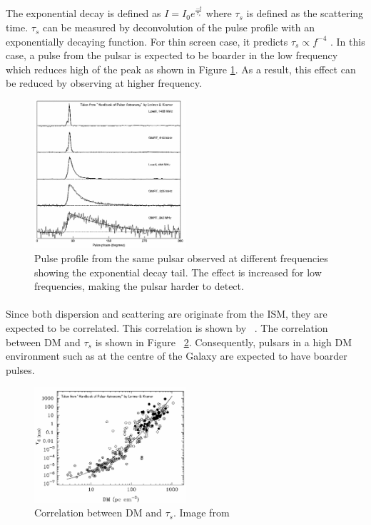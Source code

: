 \documentclass[thesis_msc.tex]{subfiles}
\begin{document}
The exponential decay is defined as $I=I_0 e^{\frac{-t}{\tau_s}}$ where $\tau_s$ is defined as the scattering time. $\tau_s$ can be measured by deconvolution of the pulse profile with an exponentially decaying function. For thin screen case, it predicts $\tau_s \propto f^{-4}$ \citep{xu2017scatter}. In this case, a pulse from the pulsar is expected to be boarder in the low frequency which reduces high of the peak as shown in Figure \ref{pscatt}. As a result, this effect can be reduced by observing at higher frequency.

    \begin{figure}[h] \centering 
\includegraphics[width=0.5\textwidth]{figures/pulsescat.png}
\caption{Pulse profile from the same pulsar observed at different frequencies showing the exponential decay tail. The effect is increased for low frequencies, making the pulsar harder to detect. \citep{handbook}  }
\label{pscatt}
\end{figure}

\paragraph{} Since both dispersion and scattering are originate from the ISM, they are expected to be correlated. This correlation is shown by ~\cite{Bhat:2004xt}. The correlation between DM and $\tau_s$ is shown in Figure ~\ref{t_dm}. Consequently, pulsars in a high DM environment such as at the centre of the Galaxy are expected to have boarder pulses.  

    \begin{figure}[h] \centering
\includegraphics[width=0.5\textwidth]{figures/t_dm.png}
\caption{Correlation between DM and $\tau_s$. Image from \citep{handbook}  }
\label{t_dm}
\end{figure}
\end{document}
